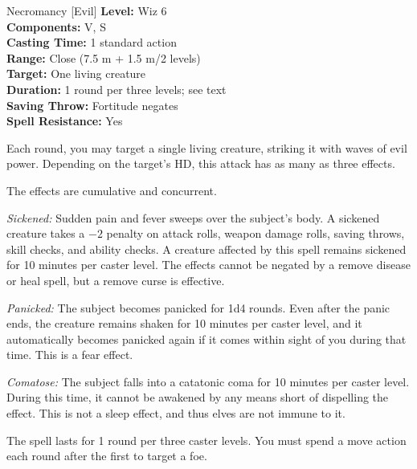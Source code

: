 {Necromancy [Evil]}
{
	\textbf{Level:}
	Wiz 6\\
	\textbf{Components:}
	V, S\\
	\textbf{Casting Time:}
	1 standard action\\
	\textbf{Range:}
	Close (7.5 m + 1.5 m/2 levels)\\
	\textbf{Target:}
	One living creature\\
	\textbf{Duration:}
	1 round per three levels; see text\\
	\textbf{Saving Throw:}
	Fortitude negates\\
	\textbf{Spell Resistance:}
	Yes\\
}
{
	Each round, you may target a single living creature, striking it with waves of evil power. Depending on the target's HD, this attack has as many as three effects.


	The effects are cumulative and concurrent.

	\textit{Sickened:}
	Sudden pain and fever sweeps over the subject's body. A sickened creature takes a $-2$ penalty on attack rolls, weapon damage rolls, saving throws, skill checks, and ability checks. A creature affected by this spell remains sickened for 10 minutes per caster level. The effects cannot be negated by a remove disease or heal spell, but a remove curse is effective.

	\textit{Panicked:}
	The subject becomes panicked for 1d4 rounds. Even after the panic ends, the creature remains shaken for 10 minutes per caster level, and it automatically becomes panicked again if it comes within sight of you during that time. This is a fear effect.

	\textit{Comatose:}
	The subject falls into a catatonic coma for 10 minutes per caster level. During this time, it cannot be awakened by any means short of dispelling the effect. This is not a sleep effect, and thus elves are not immune to it.

	The spell lasts for 1 round per three caster levels. You must spend a move action each round after the first to target a foe.

}
